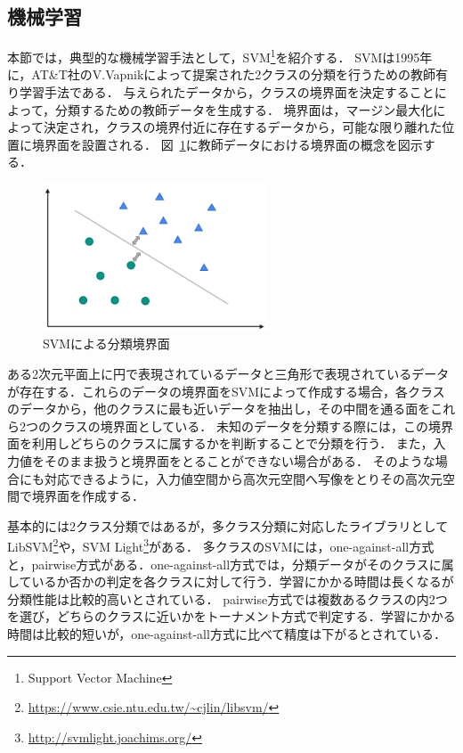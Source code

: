 \subsection{機械学習}
本節では，典型的な機械学習手法として，SVM\footnote{Support Vector Machine}を紹介する．
SVMは1995年に，AT\&T社のV.Vapnikによって提案された2クラスの分類を行うための教師有り学習手法である．
与えられたデータから，クラスの境界面を決定することによって，分類するための教師データを生成する．
境界面は，マージン最大化によって決定され，クラスの境界付近に存在するデータから，可能な限り離れた位置に境界面を設置される．
図~\ref{fig-svm}に教師データにおける境界面の概念を図示する．
\begin{figure}[H]
	\centering
    \includegraphics[width=0.6\textwidth,pagebox=artbox]{fig/svm.png}
    \caption{SVMによる分類境界面}
    \label{fig-svm}
\end{figure}
ある2次元平面上に円で表現されているデータと三角形で表現されているデータが存在する．これらのデータの境界面をSVMによって作成する場合，各クラスのデータから，他のクラスに最も近いデータを抽出し，その中間を通る面をこれら2つのクラスの境界面としている．
未知のデータを分類する際には，この境界面を利用しどちらのクラスに属するかを判断することで分類を行う．
また，入力値をそのまま扱うと境界面をとることができない場合がある．
そのような場合にも対応できるように，入力値空間から高次元空間へ写像をとりその高次元空間で境界面を作成する．

基本的には2クラス分類ではあるが，多クラス分類に対応したライブラリとしてLibSVM\footnote{\url{https://www.csie.ntu.edu.tw/~cjlin/libsvm/}}や，SVM Light\footnote{\url{http://svmlight.joachims.org/}}がある．
多クラスのSVMには，one-against-all方式と，pairwise方式がある．one-against-all方式では，分類データがそのクラスに属しているか否かの判定を各クラスに対して行う．学習にかかる時間は長くなるが分類性能は比較的高いとされている．
pairwise方式では複数あるクラスの内2つを選び，どちらのクラスに近いかをトーナメント方式で判定する．学習にかかる時間は比較的短いが，one-against-all方式に比べて精度は下がるとされている．
